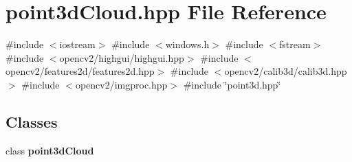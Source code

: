 \section{point3d\+Cloud.\+hpp File Reference}
\label{point3d_cloud_8hpp}
{\ttfamily \#include $<$iostream$>$}\newline
{\ttfamily \#include $<$windows.\+h$>$}\newline
{\ttfamily \#include $<$fstream$>$}\newline
{\ttfamily \#include $<$opencv2/highgui/highgui.\+hpp$>$}\newline
{\ttfamily \#include $<$opencv2/features2d/features2d.\+hpp$>$}\newline
{\ttfamily \#include $<$opencv2/calib3d/calib3d.\+hpp$>$}\newline
{\ttfamily \#include $<$opencv2/imgproc.\+hpp$>$}\newline
{\ttfamily \#include \char`\"{}point3d.\+hpp\char`\"{}}\newline
\subsection*{Classes}
\begin{DoxyCompactItemize}
\item 
class \textbf{ point3d\+Cloud}
\end{DoxyCompactItemize}
